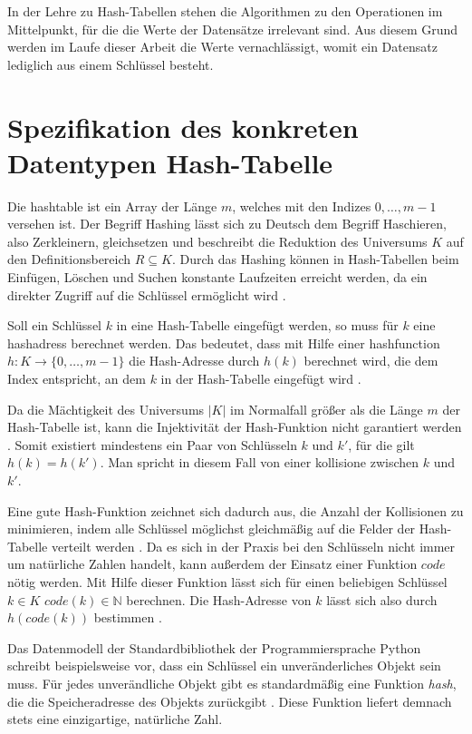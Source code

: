 In der Lehre zu Hash-Tabellen stehen die Algorithmen zu den Operationen im Mittelpunkt, für die die Werte der Datensätze irrelevant sind. Aus diesem Grund werden im Laufe dieser Arbeit die Werte vernachlässigt, womit ein Datensatz lediglich aus einem Schlüssel besteht\label{novalue}. 

\section{Spezifikation des konkreten Datentypen Hash-Tabelle}
Die \Gls{hashtable} ist ein Array der Länge \(m\), welches mit den Indizes \(0, \dots{},m-1\) versehen ist. Der Begriff Hashing lässt sich zu Deutsch dem Begriff Haschieren, also Zerkleinern, gleichsetzen und beschreibt die Reduktion des Universums \(K\) auf den Definitionsbereich \(R\subseteq{K}\). Durch das Hashing können in Hash-Tabellen beim Einfügen, Löschen und Suchen konstante Laufzeiten erreicht werden, da ein direkter Zugriff auf die Schlüssel ermöglicht wird \cite[S.~235]{ADSWeiWei}.

Soll ein Schlüssel \(k\) in eine Hash-Tabelle eingefügt werden, so muss für \(k\) eine \Gls{hashadress} berechnet werden. Das bedeutet, dass mit Hilfe einer \Gls{hashfunction} \(h: K\to{\{0, \dots{}, m-1\}}\) die Hash-Adresse durch \(h(k)\) berechnet wird, die dem Index entspricht, an dem \(k\) in der Hash-Tabelle eingefügt wird \cite[S.~191]{ADSOttWid}. 

Da die Mächtigkeit des Universums \(|K|\) im Normalfall größer als die Länge \(m\) der Hash-Tabelle ist, kann die Injektivität der Hash-Funktion nicht garantiert werden \cite[S.~191]{ADSOttWid}. Somit existiert mindestens ein Paar von Schlüsseln \(k\) und \(k'\), für die gilt \(h(k)=h(k')\). Man spricht in diesem Fall von einer \Gls{kollisione}\label{kollision} zwischen \(k\) und \(k'\)\cite[S.~235]{ADSWeiWei}.

Eine gute Hash-Funktion zeichnet sich dadurch aus, die Anzahl der Kollisionen zu minimieren, indem alle Schlüssel möglichst gleichmäßig auf die Felder der Hash-Tabelle verteilt werden \cite[S.~193]{ADSOttWid}. Da es sich in der Praxis bei den Schlüsseln nicht immer um natürliche Zahlen handelt, kann außerdem der Einsatz einer Funktion \(code\) nötig werden. Mit Hilfe dieser Funktion lässt sich für einen beliebigen Schlüssel \(k\in{K}\) \(code(k)\in{\mathbb{N}}\) berechnen. Die Hash-Adresse von \(k\) lässt sich also durch \(h(code(k))\) bestimmen \cite[S.~235]{ADSWeiWei}.

Das Datenmodell der Standardbibliothek der Programmiersprache Python schreibt beispielsweise vor, dass ein Schlüssel ein unveränderliches Objekt sein muss. Für jedes unverändliche Objekt gibt es standardmäßig eine Funktion \textit{hash}, die die Speicheradresse des Objekts zurückgibt \cite[ch.~3.4.1.]{PDoc}. Diese Funktion liefert demnach stets eine einzigartige, natürliche Zahl. 

